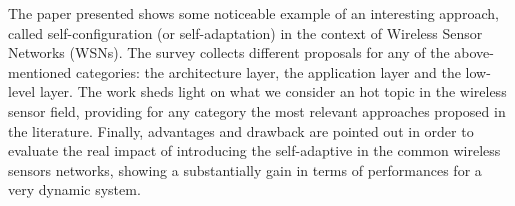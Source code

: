 The paper presented shows some noticeable example of an interesting approach, called self-configuration (or self-adaptation) in the context of Wireless Sensor Networks (WSNs). The survey collects different proposals for any of the above-mentioned categories: the architecture layer, the application layer and the low-level layer.
The work sheds light on what we consider an hot topic in the wireless sensor field, providing for any category the most relevant approaches proposed in the literature.
Finally, advantages and drawback are pointed out in order to evaluate the real impact of introducing the self-adaptive in the common wireless sensors networks, showing a substantially gain in terms of performances for a very dynamic system.